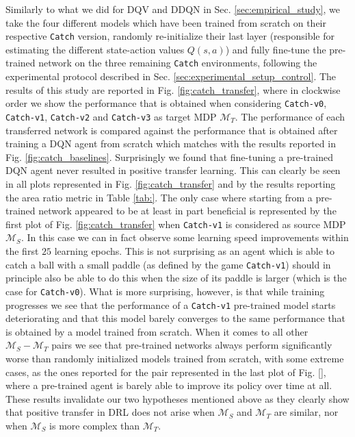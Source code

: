 Similarly to what we did for DQV and DDQN in Sec. \ref{sec:empirical_study}, we take the four different models which have been trained from scratch on their respective \texttt{Catch} version, randomly re-initialize their last layer (responsible for estimating the different state-action values $Q(s,a)$) and fully fine-tune the pre-trained network on the three remaining \texttt{Catch} environments, following the experimental protocol described in Sec. \ref{sec:experimental_setup_control}. The results of this study are reported in Fig. \ref{fig:catch_transfer}, where in clockwise order we show the performance that is obtained when considering \texttt{Catch-v0}, \texttt{Catch-v1}, \texttt{Catch-v2} and \texttt{Catch-v3} as target MDP $\mathcal{M}_T$. The performance of each transferred network is compared against the performance that is obtained after training a DQN agent from scratch which matches with the results reported in Fig. \ref{fig:catch_baselines}.
Surprisingly we found that fine-tuning a pre-trained DQN agent never resulted in positive transfer learning. This can clearly be seen in all plots represented in Fig. \ref{fig:catch_transfer} and by the results reporting the area ratio metric in Table \ref{tab:}. The only case where starting from a pre-trained network appeared to be at least in part beneficial is represented by the first plot of Fig. \ref{fig:catch_transfer} when \texttt{Catch-v1} is considered as source MDP $\mathcal{M}_S$. In this case we can in fact observe some learning speed improvements within the first $25$ learning epochs. This is not surprising as an agent which is able to catch a ball with a small paddle (as defined by the game \texttt{Catch-v1}) should in principle also be able to do this when the size of its paddle is larger (which is the case for \texttt{Catch-v0}). What is more surprising, however, is that while training progresses we see that the performance of a \texttt{Catch-v1} pre-trained model starts deteriorating and that this model barely converges to the same performance that is obtained by a model trained from scratch. When it comes to all other $\mathcal{M}_S-\mathcal{M}_T$ pairs we see that pre-trained networks always perform significantly worse than randomly initialized models trained from scratch, with some extreme cases, as the ones reported for the pair represented in the last plot of Fig. \ref{}, where a pre-trained agent is barely able to improve its policy over time at all. These results invalidate our two hypotheses mentioned above as they clearly show that positive transfer in DRL does not arise when $\mathcal{M}_S$ and $\mathcal{M}_T$ are similar, nor when $\mathcal{M}_S$ is more complex than $\mathcal{M}_T$. 

